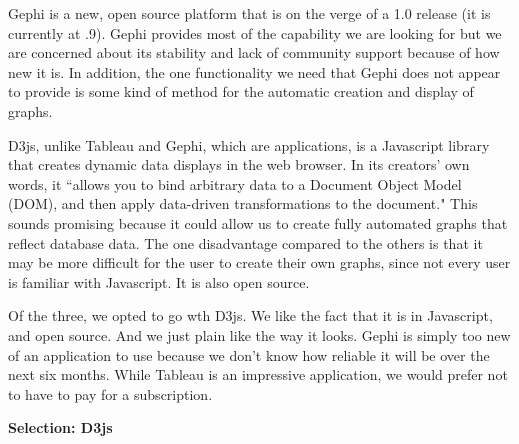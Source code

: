 \documentclass[letterpaper,10pt,titlepage]{article}
\begin{document}
Gephi is a new, open source platform that is on the verge of a 1.0 release (it is currently at .9). Gephi provides most of the capability we are looking for but we are concerned about its stability and lack of community support because of how new it is. In addition, the one functionality we need that Gephi does not appear to provide is some kind of method for the automatic creation and display of graphs.\cite{Gephi}

D3js, unlike Tableau and Gephi, which are applications, is a Javascript library that creates dynamic data displays in the web browser. In its creators' own words, it “allows you to bind arbitrary data to a Document Object Model (DOM), and then apply data-driven transformations to the document."\cite{B. Sullins} This sounds promising because it could allow us to create fully automated graphs that reflect database data. The one disadvantage compared to the others is that it may be more difficult for the user to create their own graphs, since not every user is familiar with Javascript. It is also open source.\cite{B. Sullins}

Of the three, we opted to go wth D3js. We like the fact that it is in Javascript, and open source. And we just plain like the way it looks. Gephi is simply too new of an application to use because we don't know how reliable it will be over the next six months. While Tableau is an impressive application, we would prefer not to have to pay for a subscription. 

\textbf{Selection: D3js}

\clearpage
\end{document}
